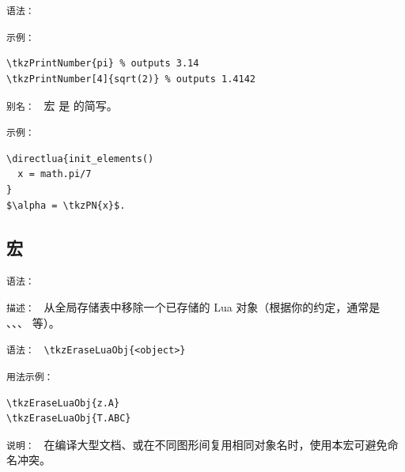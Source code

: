 \medskip

\texttt{语法： }
\begin{quote}
 \qquad
{}
\end{quote}

\texttt{示例： }

\begin{mybox}
\begin{verbatim}
\tkzPrintNumber{pi} % outputs 3.14
\tkzPrintNumber[4]{sqrt(2)} % outputs 1.4142
\end{verbatim}
\end{mybox}

\texttt{别名： } 宏  是  的简写。


\texttt{示例： }
\begin{minipage}{.52\textwidth}
\begin{verbatim}
\directlua{init_elements()
  x = math.pi/7
}
$\alpha = \tkzPN{x}$.
\end{verbatim}
\end{minipage}


\subsection{宏 }

\label{sub:macro_tkzEraseLuaObj}

\texttt{语法： }
\begin{quote}
\end{quote}



\texttt{描述： }
从全局存储表中移除一个已存储的 Lua 对象（根据你的约定，通常是 、、、 等）。


\texttt{语法： } \verb|\tkzEraseLuaObj{<object>}|

\texttt{用法示例： }

\begin{mybox}
\begin{verbatim}
\tkzEraseLuaObj{z.A}
\tkzEraseLuaObj{T.ABC}
\end{verbatim}
\end{mybox}


\texttt{说明： }
在编译大型文档、或在不同图形间复用相同对象名时，使用本宏可避免命名冲突。



